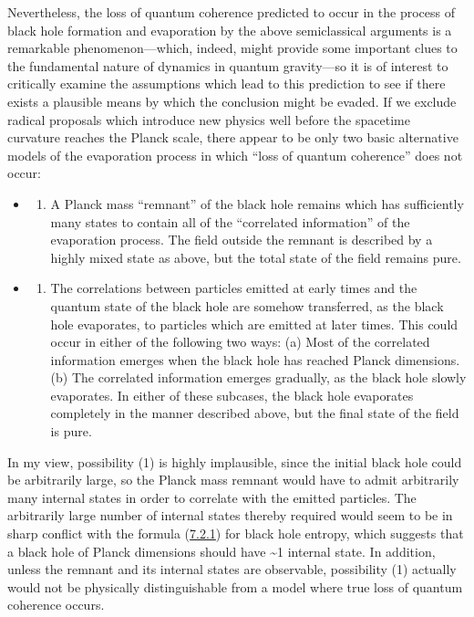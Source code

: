 \documentclass[11pt,a4paper]{article}
\providecommand{\tightlist}{\setlength{\itemsep}{0pt}\setlength{\parskip}{0pt}}
\begin{document}
Nevertheless, the loss of quantum coherence predicted to occur in the process of black hole formation and evaporation by the above semiclassical arguments is a remarkable phenomenon---which, indeed, might provide some important clues to the fundamental nature of dynamics in quantum gravity---so it is of interest to critically examine the assumptions which lead to this prediction to see if there exists a plausible means by which the conclusion might be evaded. If we exclude radical proposals which introduce new physics well before the spacetime curvature reaches the Planck scale, there appear to be only two basic alternative models of the evaporation process in which ``loss of quantum coherence'' does not occur:

\begin{itemize}
\item
  \begin{enumerate}
  \def\labelenumi{(\arabic{enumi})}
  \tightlist
  \item
    A Planck mass ``remnant'' of the black hole remains which has sufficiently many states to contain all of the ``correlated information'' of the evaporation process. The field outside the remnant is described by a highly mixed state as above, but the total state of the field remains pure.
  \end{enumerate}
\item
  \begin{enumerate}
  \def\labelenumi{(\arabic{enumi})}
  \setcounter{enumi}{1}
  \tightlist
  \item
    The correlations between particles emitted at early times and the quantum state of the black hole are somehow transferred, as the black hole evaporates, to particles which are emitted at later times. This could occur in either of the following two ways: (a) Most of the correlated information emerges when the black hole has reached Planck dimensions. (b) The correlated information emerges gradually, as the black hole slowly evaporates. In either of these subcases, the black hole evaporates completely in the manner described above, but the final state of the field is pure.
  \end{enumerate}
\end{itemize}

In my view, possibility (1) is highly implausible, since the initial black hole could be arbitrarily large, so the Planck mass remnant would have to admit arbitrarily many internal states in order to correlate with the emitted particles. The arbitrarily large number of internal states thereby required would seem to be in sharp conflict with the formula (\hyperref[eq:7.2.1]{7.2.1}) for black hole entropy, which suggests that a black hole of Planck dimensions should have \textasciitilde1 internal state. In addition, unless the remnant and its internal states are observable, possibility (1) actually would not be physically distinguishable \hypertarget{source-197}{} from a model where true loss of quantum coherence occurs.
\end{document}
